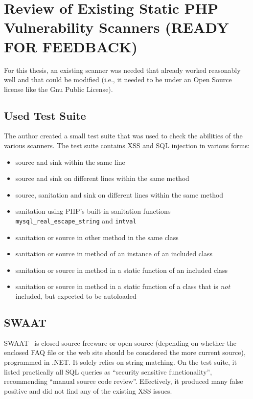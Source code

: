 \chapter{Review of Existing Static PHP Vulnerability Scanners (READY FOR FEEDBACK)}
\label{scanners}

For this thesis, an existing scanner was needed that already worked reasonably well and that could be modified (i.e., it needed to be under an Open Source license like the Gnu Public License).

\section{Used Test Suite}
The author created a small test suite that was used to check the abilities of the various scanners. The test suite contains XSS and SQL injection in various forms:
\begin{itemize}
 \item source and sink within the same line
 \item source and sink on different lines within the same method
 \item source, sanitation and sink on different lines within the same method
 \item sanitation using PHP's built-in sanitation functions \texttt{mysql\_real\_escape\_string} and \texttt{intval}
 \item sanitation or source in other method in the same class
 \item sanitation or source in method of an instance of an included class
 \item sanitation or source in method in a static function of an included class
 \item sanitation or source in method in a static function of a class that is \emph{not} included, but expected to be autoloaded
\end{itemize}

\section{SWAAT}
\label{swaat}
SWAAT~\cite{swaat} is closed-source freeware or open source (depending on whether the enclosed FAQ file or the web site should be considered the more current source), programmed in .NET. It solely relies on string matching. On the test suite, it listed practically all SQL queries as ``security sensitive functionality'', recommending ``manual source code review''. Effectively, it produced many false positive and did not find any of the existing XSS issues.

